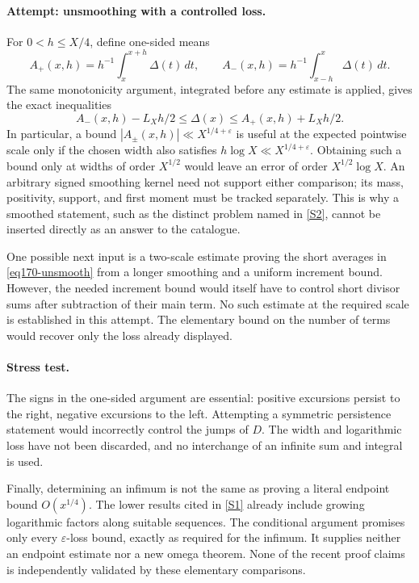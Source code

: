 \documentclass[11pt,a4paper]{article}
\newcommand{\eps}{\varepsilon}
\newcommand{\sref}[2]{\hyperlink{source:#1:#2}{[S#2]}}
\numberwithin{equation}{section}
\begin{document}
\paragraph{Attempt: unsmoothing with a controlled loss.}
For $0<h\le X/4$, define one-sided means
\[
 A_+(x,h)=h^{-1}\int_x^{x+h}\Delta(t)\,dt,\qquad
 A_-(x,h)=h^{-1}\int_{x-h}^{x}\Delta(t)\,dt.
\]
The same monotonicity argument, integrated before any estimate is applied,
gives the exact inequalities
\begin{equation}\label{eq170-unsmooth}
 A_-(x,h)-L_Xh/2\le\Delta(x)
                    \le A_+(x,h)+L_Xh/2.
\end{equation}
In particular, a bound $|A_\pm(x,h)|\ll X^{1/4+\eps}$ is useful at the
expected pointwise scale only if the chosen width also satisfies
$h\log X\ll X^{1/4+\eps}$. Obtaining such a bound only at widths of
order $X^{1/2}$ would leave an error of order $X^{1/2}\log X$.
An arbitrary signed smoothing kernel need not support either comparison;
its mass, positivity, support, and first moment must be tracked separately.
This is why a smoothed statement, such as the distinct problem named in
\sref{170}{2}, cannot be inserted directly as an answer to the catalogue.

One possible next input is a two-scale estimate proving the short averages
in \eqref{eq170-unsmooth} from a longer smoothing and a uniform increment
bound. However, the needed increment bound would itself have to control
short divisor sums after subtraction of their main term. No such estimate
at the required scale is established in this attempt. The elementary bound
on the number of terms would recover only the loss already displayed.

\paragraph{Stress test.}
The signs in the one-sided argument are essential: positive excursions
persist to the right, negative excursions to the left. Attempting a
symmetric persistence statement would incorrectly control the jumps of
$D$. The width and logarithmic loss have not been discarded, and no
interchange of an infinite sum and integral is used.

Finally, determining an infimum is not the same as proving a literal
endpoint bound $O(x^{1/4})$. The lower results cited in \sref{170}{1}
already include growing logarithmic factors along suitable sequences. The
conditional argument promises only every $\eps$-loss bound, exactly as
required for the infimum. It supplies neither an endpoint estimate nor a
new omega theorem. None of the recent proof claims is independently
validated by these elementary comparisons.
\end{document}
